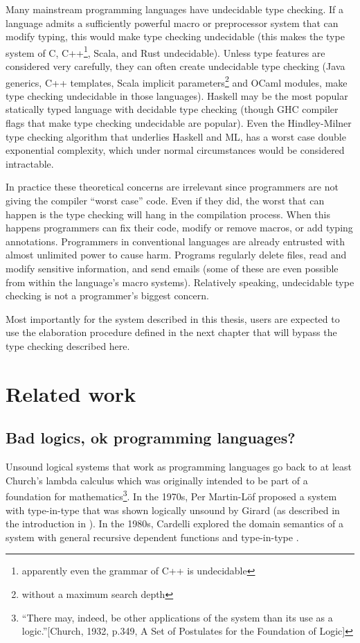 Many mainstream programming languages have undecidable type checking.
If a language admits a sufficiently powerful macro or preprocessor system that can modify typing, this would make type checking undecidable (this makes the type system of C, C++\footnote{apparently even the grammar of C++ is undecidable}, Scala, and Rust undecidable).
Unless type features are considered very carefully, they can often create undecidable type checking (Java generics, C++ templates, Scala implicit parameters\footnote{without a maximum search depth} and OCaml modules, make type checking undecidable in those languages).
Haskell may be the most popular statically typed language with decidable type checking (though GHC compiler flags that make type checking undecidable are popular).
Even the Hindley-Milner type checking algorithm that underlies Haskell and ML, has a worst case double exponential complexity, which under normal circumstances would be considered intractable.

In practice these theoretical concerns are irrelevant since programmers are not giving the compiler ``worst case'' code.
Even if they did, the worst that can happen is the type checking will hang in the compilation process.
When this happens programmers can fix their code, modify or remove macros, or add typing annotations.
Programmers in conventional languages are already entrusted with almost unlimited power to cause harm.
Programs regularly delete files, read and modify sensitive information, and send emails (some of these are even possible from within the language's macro systems).
Relatively speaking, undecidable type checking is not a programmer's biggest concern.

Most importantly for the system described in this thesis, users are expected to use the elaboration procedure defined in the next chapter that will bypass the type checking described here.

\section{Related work}

\subsection{Bad logics, ok programming languages?}

Unsound logical systems that work as programming languages go back to at least Church's lambda calculus which was originally intended to be part of a foundation for mathematics\footnote{``There may, indeed, be other applications of the system than its use as a logic.''{[}Church, 1932, p.349, A Set of Postulates for the Foundation of Logic{]}}.
In the 1970s, Per Martin-L{\"o}f proposed a system with type-in-type that was shown logically unsound by Girard (as described in the introduction in \cite{Martin-Lof-1972}).
In the 1980s, Cardelli explored the domain semantics of a system with general recursive dependent functions and type-in-type \cite{cardelli1986polymorphic}.


